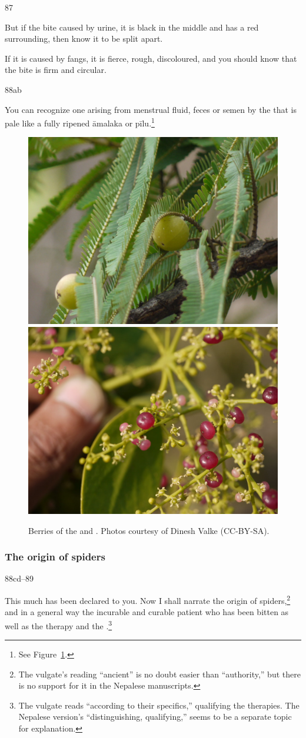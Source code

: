 \begin{translation}
\item[87]

But if the bite caused by urine, it is black in the middle and has a red 
surrounding, then know it to be split apart. 

If it is caused by fangs, it is fierce, rough, discoloured, and 
you  should know that the bite is firm and circular.

\item[88ab]

You can recognize one arising from menstrual fluid, feces or semen by
the  that is pale like a fully ripened \gls{āmalaka} or
\gls{pīlu}.\footnote{See Figure~\ref{fig:pilufruit}.}
%
\begin{figure}
    \centering
    \includegraphics[width=0.46\linewidth]{media/amalaka_fruit}
    \hfill
    \includegraphics[width=0.46\linewidth]{media/pilu_fruit}
        \caption{Berries of the  and . Photos 
        courtesy of Dinesh Valke (CC-BY-SA).}
    \label{fig:pilufruit}
\end{figure}


\subsubsection{The origin of spiders}
\item[88cd--89]

This much has been declared to you.  Now I shall narrate the
 origin of spiders,\footnote{The vulgate's reading
     “ancient” is no doubt easier than 
    “authority,” but there is no support for it in the Nepalese
    manuscripts.} and in a general way the incurable and curable patient
    who has been bitten as well as the therapy and the .\footnote{The vulgate reads  “according
        to their specifics,” qualifying the therapies.  The Nepalese version's
         “distinguishing, qualifying,” seems to be a
        separate topic for explanation.}
 

\end{translation}
